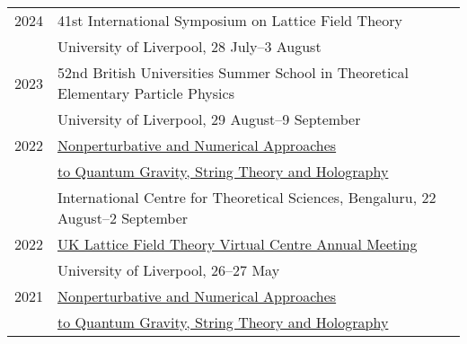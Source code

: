 \documentclass[10 pt]{article}
\begin{document}
\vspace{-12 pt} %
\begin{tabular}[t]{cl}
  2024 & 41st International Symposium on Lattice Field Theory                                                                                                                        \\
       & University of Liverpool, 28 July--3 August                                                                                                                                  \\[6 pt]
  2023 & 52nd British Universities Summer School in Theoretical Elementary Particle Physics                                                                                          \\
       & University of Liverpool, 29 August--9 September                                                                                                                             \\[6 pt]
  2022 & \href{https://www.icts.res.in/program/numstrings2022}{Nonperturbative and Numerical Approaches}                                                                             \\
       & \hfill \href{https://www.icts.res.in/program/numstrings2022}{to Quantum Gravity, String Theory and Holography}                                                              \\
       & International Centre for Theoretical Sciences, Bengaluru, 22 August--2 September                                                                                            \\[6 pt]
  2022 & \href{http://generic.wordpress.soton.ac.uk/uklft/2022/04/11/uklft-annual-meeting-26-27-may-2022/}{UK Lattice Field Theory Virtual Centre Annual Meeting}                    \\
       & University of Liverpool, 26--27 May                                                                                                                                         \\[6 pt]
  2021 & \href{https://www.icts.res.in/program/numstrings2021}{Nonperturbative and Numerical Approaches}                                                                             \\
       & \hfill \href{https://www.icts.res.in/program/numstrings2021}{to Quantum Gravity, String Theory and Holography}                                                              \\

\end{tabular}
\end{document}
